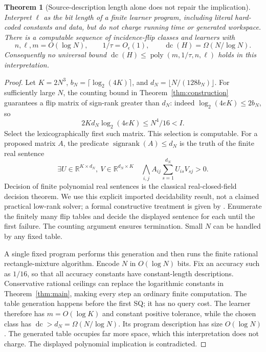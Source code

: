 \documentclass[11pt]{article}
\newtheorem{theorem}{Theorem}
\DeclareMathOperator{\dc}{dc}
\DeclareMathOperator{\sr}{signrank}
\newcommand{\R}{\mathbb R}
\newcommand{\1}{\mathbf 1}
\begin{document}
\begin{samepage}
\begin{theorem}[Source-description length alone does not repair the implication]\label{thm:description}
Interpret $\ell$ as the bit length of a finite learner program, including literal hard-coded constants and data, but do not charge running time or generated workspace. There is a computable sequence of incidence-flip classes and learners with
\[
 n,\ell,m=O(\log N),\qquad 1/\tau=O_\epsilon(1),\qquad
 \dc(H)=\Omega(N/\log N).
\]
Consequently no universal bound $\dc(H)\le\operatorname{poly}(m,1/\tau,n,\ell)$ holds in this interpretation.
\end{theorem}
\end{samepage}
\begin{proof}
Let $K=2N^3$, $b_N=\lceil\log_2(4K)\rceil$, and $d_N=\lfloor N/(128b_N)\rfloor$. For sufficiently large $N$, the counting bound in Theorem~\ref{thm:construction} guarantees a flip matrix of sign-rank greater than $d_N$: indeed $\log_2(4eK)\le2b_N$, so
\[
 2Kd_N\log_2(4eK)\le N^4/16<I.
\]
Select the lexicographically first such matrix. This selection is computable. For a proposed matrix $A$, the predicate $\sr(A)\le d_N$ is the truth of the finite real sentence
\[
 \exists U\in\R^{K\times d_N},\ V\in\R^{d_N\times K}\quad
 \bigwedge_{i,j} A_{ij}\sum_{s=1}^{d_N}U_{is}V_{sj}>0.
\]
Decision of finite polynomial real sentences is the classical real-closed-field decision theorem. We use this explicit imported decidability result, not a claimed practical low-rank solver; a formal constructive treatment is given by \citet{MC12}. Enumerate the finitely many flip tables and decide the displayed sentence for each until the first failure. The counting argument ensures termination. Small $N$ can be handled by any fixed table.

A single fixed program performs this generation and then runs the finite rational rectangle-mixture algorithm. Encode $N$ in $O(\log N)$ bits. Fix an accuracy such as $1/16$, so that all accuracy constants have constant-length descriptions. Conservative rational ceilings can replace the logarithmic constants in Theorem~\ref{thm:main}, making every step an ordinary finite computation. The table generation happens before the first SQ; it has no query cost. The learner therefore has $m=O(\log K)$ and constant positive tolerance, while the chosen class has $\dc>d_N=\Omega(N/\log N)$. Its program description has size $O(\log N)$. The generated table occupies far more space, which this interpretation does not charge. The displayed polynomial implication is contradicted.
\end{proof}
\end{document}
